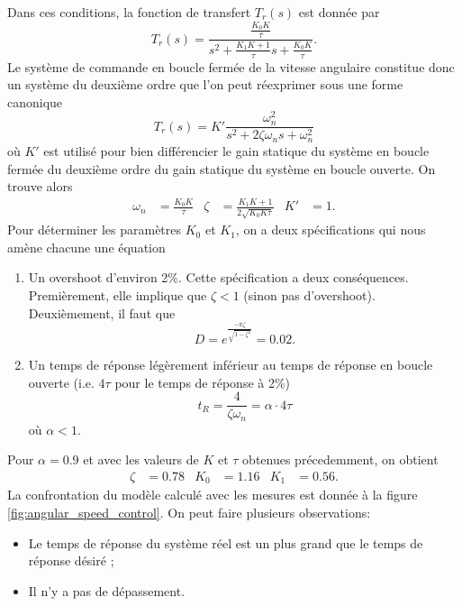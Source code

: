 \documentclass[frenchb, paper=a4, fontsize=11pt]{scrartcl}
\numberwithin{equation}{section}					%
\numberwithin{figure}{section}					%
\numberwithin{table}{section}						%
\begin{document}
Dans ces conditions, la fonction de transfert $T_r(s)$ est donnée
par
\begin{equation}
	T_r(s) = \frac{\frac{K_0K}{\tau}}{s^2 +\frac{K_1K+1}{\tau}s + \frac{K_0K}{\tau}}.
\end{equation}
Le système de commande en boucle fermée de la vitesse angulaire
constitue donc un système du deuxième ordre que l'on peut réexprimer
sous une forme canonique
\begin{equation}
	T_r(s) = K'\frac{\omega_n^2}{s^2 + 2\zeta\omega_n s+ \omega_n^2}
\end{equation}
où $K'$ est utilisé pour bien différencier le gain statique du système en
boucle fermée du deuxième ordre du gain statique du système en boucle
ouverte. On trouve alors
\begin{align}
	\omega_n & = \frac{K_0K}{\tau} & \zeta & = \frac{K_1K + 1}{2\sqrt{K_0K\tau}}
	& K' & = 1.
\end{align}
Pour déterminer les paramètres $K_0$ et $K_1$, on a deux spécifications
qui nous amène chacune une équation
\begin{enumerate}
	\item Un overshoot d'environ 2\%. Cette spécification a deux conséquences.
	Premièrement, elle implique que $\zeta < 1$ (sinon pas d'overshoot). Deuxièmement,
	il faut que
	\begin{equation}
		D = e^{\frac{-\pi\zeta}{\sqrt{1-\zeta^2}}} = 0.02.
	\end{equation}
	\item Un temps de réponse légèrement inférieur au temps de réponse en boucle
	ouverte (i.e. $4\tau$ pour le temps de réponse à 2\%)
	\begin{equation}
		t_R = \frac{4}{\zeta\omega_n} = \alpha \cdot 4\tau
	\end{equation}
	où $\alpha < 1$.
\end{enumerate}
Pour $\alpha = 0.9$ et avec les valeurs de $K$ et $\tau$ obtenues précedemment,
on obtient
\begin{align}
	\zeta & = 0.78 & K_0 & = 1.16 & K_1 & = 0.56.
\end{align}
La confrontation du modèle calculé avec les mesures est donnée à la
figure \ref{fig:angular_speed_control}. On peut faire plusieurs
observations:
\begin{itemize}
	\item Le temps de réponse du système réel est un plus grand que le temps
	de réponse désiré ;
	\item Il n'y a pas de dépassement.
\end{itemize}
\end{document}
